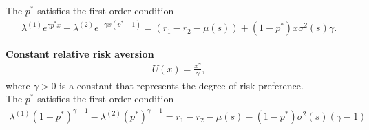 \documentclass{article} %
\theoremstyle{plain}
\theoremstyle{definition} %
\begin{document}
The $p^*$ satisfies the first order condition
\begin{align*}
  \lambda^{(1)} e^{\gamma p^*x}
  - \lambda^{(2)} e^{-\gamma x (p^*-1)} = (r_1 - r_2 - \mu(s)) + (1-p^*)x\sigma^2(s) \gamma.  
\end{align*}

\textbf{Constant relative risk aversion}
\begin{align*}
  U(x) = \frac{x^\gamma}{\gamma}, 
\end{align*}
where $\gamma > 0$ is a constant that represents the degree of risk preference. \\

The $p^*$ satisfies the first order condition
\begin{align*}
  \lambda^{(1)}(1-p^*)^{\gamma-1} - \lambda^{(2)}(p^*)^{\gamma-1}=r_1-r_2 - \mu(s) - (1-p^*)\sigma^2(s) (\gamma - 1) 
\end{align*}






\end{document}
